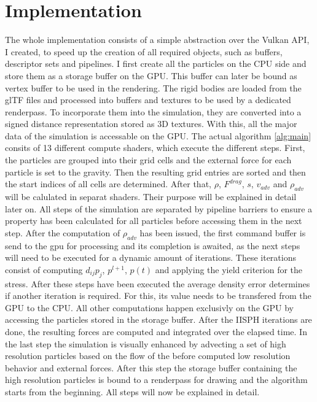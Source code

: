 \documentclass[intern]{cgMA}
\begin{document}
    \section{Implementation}\label{sec:impl}
    The whole implementation consists of a simple abstraction over the Vulkan API, I created, to speed up the creation of all required objects, such as buffers, descriptor sets and pipelines. I first create all the particles on the CPU side and store them as a storage buffer on the GPU. This buffer can later be bound as vertex buffer to be used in the rendering. The rigid bodies are loaded from the glTF files and processed into buffers and textures to be used by a dedicated renderpass. To incorporate them into the simulation, they are converted into a signed distance representation stored as 3D textures. With this, all the major data of the simulation is accessable on the GPU.
    The actual algorithm \ref*{alg:main} consits of 13 different compute shaders, which execute the different steps. First, the particles are grouped into their grid cells and the external force for each particle is set to the gravity. Then the resulting grid entries are sorted and then the start indices of all cells are determined. After that, $\rho$, $F^{drag}$, $s$, $v_{adv}$ and $\rho_{adv}$ will be calulated in separat shaders. Their purpose will be explained in detail later on. All steps of the simulation are separated by pipeline barriers to ensure a property has been calculated for all particles before accessing them in the next step. After the computation of $\rho_{adv}$ has been issued, the first command buffer is send to the gpu for processing and its completion is awaited, as the next steps will need to be executed for a dynamic amount of iterations. These iterations consist of computing $d_{ij}p_{j}$, $p^{l+1}$, $p(t)$ and applying the yield criterion for the stress. After these steps have been executed the average density error determines if another iteration is required. For this, its value needs to be transfered from the GPU to the CPU. All other computations happen exclusivly on the GPU by accessing the particles stored in the storage buffer. After the IISPH iterations are done, the resulting forces are computed and integrated over the elapsed time. In the last step the simulation is visually enhanced by advecting a set of high resolution particles based on the flow of the before computed low resolution behavior and external forces. After this step the storage buffer containing the high resolution particles is bound to a renderpass for drawing and the algorithm starts from the beginning. All steps will now be explained in detail.
\end{document}
